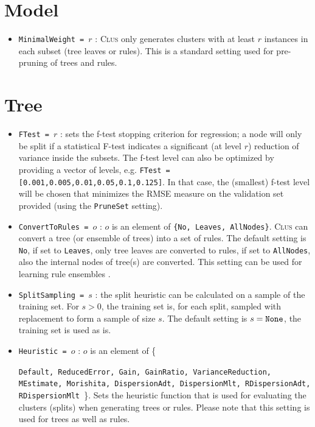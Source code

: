 \documentclass[a4paper]{report}
\newcommand{\clus}{\textsc{Clus}}
\begin{document}
\section{Model}

\begin{itemize}
\item {\tt MinimalWeight = $r$} : \clus{} only generates clusters with at least $r$ instances in each subset (tree leaves or rules). This is a standard setting used for pre-pruning of trees and rules.
\end{itemize}

\section{Tree}

\begin{itemize}
	\item {\tt FTest = $r$} : sets the f-test stopping criterion for regression; a node will only be split if a statistical F-test indicates a significant (at level $r$) reduction of variance inside the subsets. The f-test level can also be optimized by providing a vector of levels, e.g. {\tt FTest = [0.001,0.005,0.01,0.05,0.1,0.125]}. In that case, the (smallest) f-test level will be chosen that minimizes the RMSE measure on the validation set provided (using the {\tt PruneSet} setting).
	\item {\tt ConvertToRules = $o$} : $o$ is an element of \texttt{\{No, Leaves, AllNodes\}}. \clus{} can convert a tree (or ensemble of trees) into a set of rules. The default setting is \texttt{No}, if set to \texttt{Leaves}, only tree leaves are converted to rules, if set to \texttt{AllNodes}, also the internal nodes of tree(s) are converted. This setting can be used for learning rule ensembles \cite{Aho2009}.
	\item {\tt SplitSampling = $s$} : the split heuristic can be calculated on a sample of the training set. For $s > 0$, the training set is, for each split, sampled with replacement to form a sample of size $s$. The default setting is $s = {\tt None}$, the training set is used as is. 
	\item \texttt{Heuristic = $o$} : $o$ is an element of \{\raggedright\texttt{Default, ReducedError, Gain, GainRatio, %
	VarianceReduction, MEstimate, Morishita, DispersionAdt, DispersionMlt, RDispersionAdt, RDispersionMlt%
	}\}. Sets the heuristic function that is used for evaluating the clusters (splits) when generating trees or rules. Please note that this setting is used for trees as well as rules.

\end{itemize}
\end{document}
